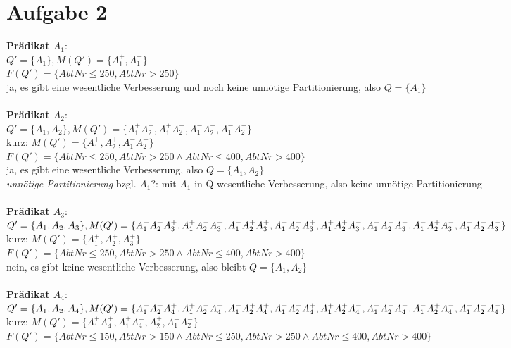 \documentclass[a4paper]{article}
\begin{document}
\section*{Aufgabe 2}
\textbf{Prädikat $ A_1 $}:\\
$ Q' = \{ A_1 \}, M(Q') = \{ A_1^+, A_1^-\} $\\
$ F(Q') = \{ AbtNr\leq 250, AbtNr>250\} $\\
ja, es gibt eine wesentliche Verbesserung und noch keine unnötige Partitionierung, also $ Q = \{ A_1 \} $\\
\\
\textbf{Prädikat $ A_2 $}:\\
$ Q' = \{ A_1, A_2 \}, M(Q') = \{ A_1^+ A_2^+, A_1^+ A_2^-, A_1^- A_2^+, A_1^- A_2^-\} $\\
kurz: $ M(Q') = \{ A_1^+, A_2^+, A_1^- A_2^-\} $\\
$ F(Q') = \{ AbtNr\leq 250, AbtNr>250 \wedge AbtNr \leq 400, AbtNr > 400 \} $\\
ja, es gibt eine wesentliche Verbesserung, also $ Q = \{ A_1, A_2 \} $ \\
\textit{unnötige Partitionierung} bzgl. $ A_1 $?: mit $ A_1 $ in Q wesentliche Verbesserung, also keine unnötige Partitionierung\\
\\
\textbf{Prädikat $ A_3 $}:\\
$ Q' = \{ A_1, A_2, A_3 \}, \\
M(Q') = \{ A_1^+ A_2^+ A_3^+, A_1^+ A_2^- A_3^+, A_1^- A_2^+ A_3^+, A_1^- A_2^- A_3^+, A_1^+ A_2^+ A_3^-, A_1^+ A_2^- A_3^-, A_1^- A_2^+ A_3^-, A_1^- A_2^- A_3^-\} $\\
kurz: $ M(Q') = \{ A_1^+, A_2^+, A_3^+ \} $\\
$ F(Q') = \{ AbtNr\leq 250, AbtNr>250 \wedge AbtNr \leq 400, AbtNr > 400 \} $\\
nein, es gibt keine wesentliche Verbesserung, also bleibt $ Q = \{ A_1, A_2 \} $ \\
\\
\textbf{Prädikat $ A_4 $}:\\
$ Q' = \{ A_1, A_2, A_4 \}, \\
M(Q') = \{ A_1^+ A_2^+ A_4^+, A_1^+ A_2^- A_4^+, A_1^- A_2^+ A_4^+, A_1^- A_2^- A_4^+, A_1^+ A_2^+ A_4^-, A_1^+ A_2^- A_4^-, A_1^- A_2^+ A_4^-, A_1^- A_2^- A_4^-\} $\\
kurz: $ M(Q') = \{ A_1^+ A_4^+, A_1^+ A_4^-, A_2^+, A_1^- A_2^-\} $\\
$ F(Q') = \{ AbtNr\leq 150, AbtNr >150 \wedge AbtNr \leq 250, AbtNr>250 \wedge AbtNr \leq 400, AbtNr > 400 \} $\\
\end{document}
